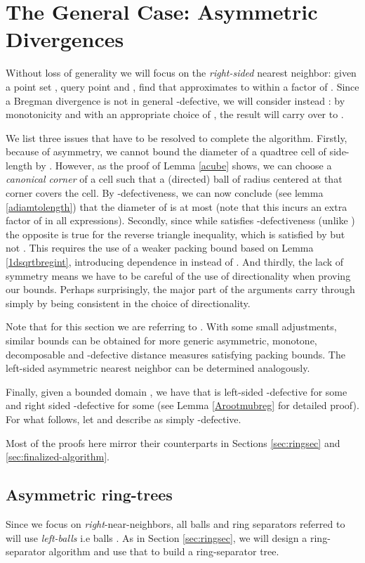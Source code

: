 \documentclass[11pt]{myclass}
\begin{document}
\section{The General Case: Asymmetric Divergences}\label{sec:generalizations}

Without loss of generality we will focus on the \emph{right-sided} nearest neighbor: given a point set , query point  and , find  that approximates  to within a factor of .  Since a Bregman divergence is not in general -defective, we will consider instead : by monotonicity and with an appropriate choice of , the result will carry over to . 

We list  three issues that have to be resolved to complete the algorithm. Firstly, because of asymmetry, we cannot bound the diameter of a 
quadtree cell  of side-length  by . However, as the proof of Lemma \ref{acube} shows, we can 
choose a \emph{canonical corner} of a cell such that a (directed) ball of radius  centered at that corner covers the cell. 
By -defectiveness, we can now conclude (see lemma \ref{adiamtolength}) that the diameter of  is at most  (note that this incurs an extra 
factor of  in all expressions). Secondly, since while  satisfies -defectiveness (unlike ) the opposite is 
true for the reverse triangle inequality, which is satisfied by  but not . This requires the use of a weaker packing 
bound based on Lemma \ref{1dsqrtbregint}, introducing dependence in  instead of . And thirdly, the lack of symmetry means
we have to be careful of the use of directionality when proving our bounds. Perhaps surprisingly, the major part of the arguments
carry through simply by being consistent in the choice of directionality.



 Note that for this section  we are referring to .
 With some small adjustments, similar bounds can be obtained for
more generic asymmetric, monotone, decomposable and -defective distance  measures satisfying packing bounds.
The left-sided asymmetric nearest neighbor can be determined analogously.

Finally, given a bounded domain , we have that   is left-sided -defective 
for some  and right sided -defective for some  (see Lemma \ref{Arootmubreg} for detailed proof). 
For what follows, let   and describe  as simply -defective. 


Most of the proofs here mirror their counterparts in Sections \ref{sec:ringsec} and \ref{sec:finalized-algorithm}. 

\subsection{Asymmetric ring-trees}
\label{subsec:ringextension} 
Since we focus on \emph{right}-near-neighbors, all balls and ring separators referred to will use \emph{left-balls}
 i.e balls . As in Section \ref{sec:ringsec}, we will design a ring-separator algorithm and 
use that to build a ring-separator tree.
\end{document}
